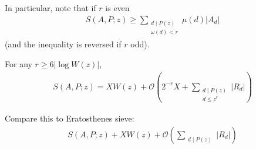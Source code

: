 \documentclass{article}
\newcommand{\1}{\mathbbm{1}}
\newcommand{\bigO}{\mathcal{O}}
\begin{document}
In particular, note that if $r$ is even
\begin{align*}
  S(A,P;z) \geq \sum_{\substack{d \mid P(z) \\ \omega(d) < r}} \mu(d) |A_d|
\end{align*}
(and the inequality is reversed if $r$ odd).

\begin{thm}
  \newlec
  For any $r \geq 6 |\log W(z)|$,
  \begin{align*}
    S(A,P;z) = XW(z) + \bigO\left(2^{-r} X + \sum_{\substack{d \mid P(z) \\ d \leq z^r}} |R_d|\right)
  \end{align*}
\end{thm}
Compare this to Eratosthenes sieve:
\begin{align*}
  S(A,P;z) + X W(z) + \bigO\left(\sum_{\substack{d \mid P(z)}} |R_d|\right)
\end{align*}
\end{document}
